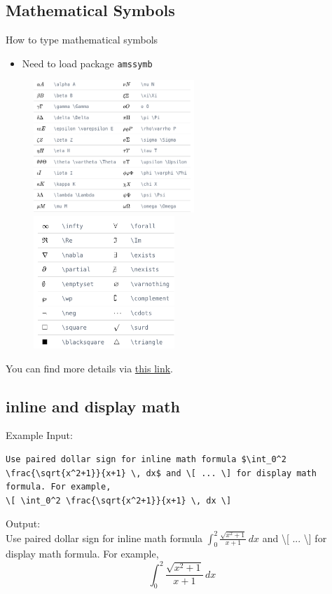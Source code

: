 \documentclass [xcolor=svgnames, t] {beamer}
\begin{document}
\subsection{Mathematical Symbols}
\begin{frame}{How to type mathematical symbols}
    \begin{itemize}
        \item Need to load package \texttt{amssymb}
    \end{itemize}
    \begin{figure}
        \centering
        \includegraphics[height = 50mm]{figures/GreekLetters.png}
        \includegraphics[height = 50mm]{figures/mathsymbol.png}
    \end{figure}

    You can find more details via \href{https://www.overleaf.com/learn/latex/List_of_Greek_letters_and_math_symbols}{this link}.
\end{frame}

\subsection{inline and display math}
\begin{frame}[fragile]{Example}
    Input:\\
    \begin{lstlisting}
Use paired dollar sign for inline math formula $\int_0^2 \frac{\sqrt{x^2+1}}{x+1} \, dx$ and \[ ... \] for display math formula. For example, 
\[ \int_0^2 \frac{\sqrt{x^2+1}}{x+1} \, dx \]\end{lstlisting}
    Output:\\
    Use paired dollar sign for inline math formula $\int_0^2 \frac{\sqrt{x^2+1}}{x+1} \, dx$ and \textbackslash[ ... \textbackslash] for display math formula. For example, 
    \[ \int_0^2 \frac{\sqrt{x^2+1}}{x+1} \, dx \]
\end{frame}
\end{document}
